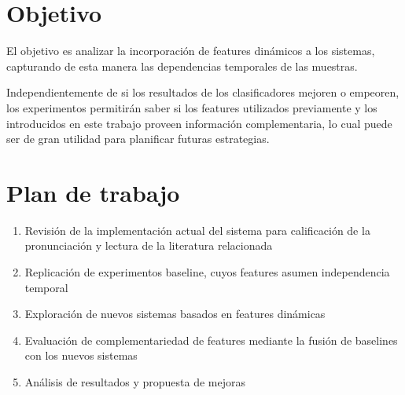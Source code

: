 \documentclass[a4paper,12pt]{article} %
\begin{document}
\section{Objetivo}

El objetivo es analizar la incorporación de features dinámicos a los sistemas, capturando
de esta manera las dependencias temporales de las muestras.

Independientemente de si los resultados de los clasificadores mejoren o empeoren, los
experimentos permitirán saber si los features utilizados previamente y los introducidos
en este trabajo proveen información complementaria, lo cual puede ser de gran utilidad
para planificar futuras estrategias.


\section{Plan de trabajo}

\begin{enumerate}
	\item Revisi\'on de la implementaci\'on actual del sistema para calificación de la pronunciación y lectura de la literatura relacionada
	\item Replicaci\'on de experimentos baseline, cuyos features asumen independencia temporal
	\item Exploraci\'on de nuevos sistemas basados en features din\'amicas
	\item Evaluaci\'on de complementariedad de features mediante la fusi\'on de baselines con los nuevos sistemas
	\item An\'alisis de resultados y propuesta de mejoras
\end{enumerate}
\end{document}
